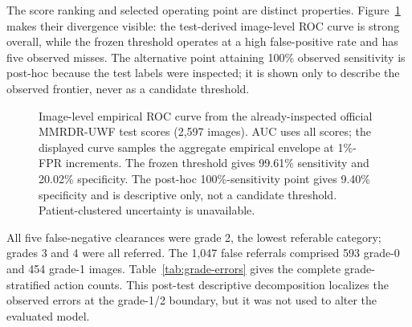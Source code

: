 \documentclass{ieeeaccess}
\begin{document}
The score ranking and selected operating point are distinct properties. Figure~\ref{fig:mmrdr-roc} makes their divergence visible: the test-derived image-level ROC curve is strong overall, while the frozen threshold operates at a high false-positive rate and has five observed misses. The alternative point attaining 100\% observed sensitivity is post-hoc because the test labels were inspected; it is shown only to describe the observed frontier, never as a candidate threshold.

\begin{figure}[t]
\centering
{}
\caption{Image-level empirical ROC curve from the already-inspected official MMRDR-UWF test scores (2,597 images). AUC uses all scores; the displayed curve samples the aggregate empirical envelope at 1\%-FPR increments. The frozen threshold gives 99.61\% sensitivity and 20.02\% specificity. The post-hoc 100\%-sensitivity point gives 9.40\% specificity and is descriptive only, not a candidate threshold. Patient-clustered uncertainty is unavailable.}
\label{fig:mmrdr-roc}
\end{figure}

All five false-negative clearances were grade 2, the lowest referable category; grades 3 and 4 were all referred. The 1,047 false referrals comprised 593 grade-0 and 454 grade-1 images. Table~\ref{tab:grade-errors} gives the complete grade-stratified action counts. This post-test descriptive decomposition localizes the observed errors at the grade-1/2 boundary, but it was not used to alter the evaluated model.
\end{document}

